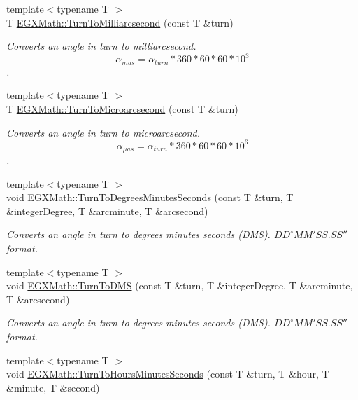 \begin{DoxyCompactItemize}
{\footnotesize template$<$typename T $>$ }\\T \mbox{\hyperlink{group___e_g_x_math-_conversions-_angle_conversions-_turn_ga05d6fea8f8475831e93dd23f6196393f}{E\+G\+X\+Math\+::\+Turn\+To\+Milliarcsecond}} (const T \&turn)
\begin{DoxyCompactList}\small\item\em Converts an angle in turn to milliarcsecond. \[\alpha_{mas}=\alpha_{turn}* 360 * 60 * 60 * 10^3\]. \end{DoxyCompactList}\item 
{\footnotesize template$<$typename T $>$ }\\T \mbox{\hyperlink{group___e_g_x_math-_conversions-_angle_conversions-_turn_ga41a861a04d65aab05647b32142e6d80d}{E\+G\+X\+Math\+::\+Turn\+To\+Microarcsecond}} (const T \&turn)
\begin{DoxyCompactList}\small\item\em Converts an angle in turn to microarcsecond. \[\alpha_{\mu as}=\alpha_{turn} * 360 * 60 * 60 * 10^6\]. \end{DoxyCompactList}\item 
{\footnotesize template$<$typename T $>$ }\\void \mbox{\hyperlink{group___e_g_x_math-_conversions-_angle_conversions-_turn_gaefdee18d878c2e66e7bd737c8900ab30}{E\+G\+X\+Math\+::\+Turn\+To\+Degrees\+Minutes\+Seconds}} (const T \&turn, T \&integer\+Degree, T \&arcminute, T \&arcsecond)
\begin{DoxyCompactList}\small\item\em Converts an angle in turn to degrees minutes seconds (D\+MS). ${DD}^{\circ}{MM}'{SS.SS}''$ format. \end{DoxyCompactList}\item 
{\footnotesize template$<$typename T $>$ }\\void \mbox{\hyperlink{group___e_g_x_math-_conversions-_angle_conversions-_turn_ga6ca011c0ae55ae079402080d7a1b4010}{E\+G\+X\+Math\+::\+Turn\+To\+D\+MS}} (const T \&turn, T \&integer\+Degree, T \&arcminute, T \&arcsecond)
\begin{DoxyCompactList}\small\item\em Converts an angle in turn to degrees minutes seconds (D\+MS). ${DD}^{\circ}{MM}'{SS.SS}''$ format. \end{DoxyCompactList}\item 
{\footnotesize template$<$typename T $>$ }\\void \mbox{\hyperlink{group___e_g_x_math-_conversions-_angle_conversions-_turn_ga0bc017b3314253352ddec728d3f6b76a}{E\+G\+X\+Math\+::\+Turn\+To\+Hours\+Minutes\+Seconds}} (const T \&turn, T \&hour, T \&minute, T \&second)

\end{DoxyCompactItemize}
